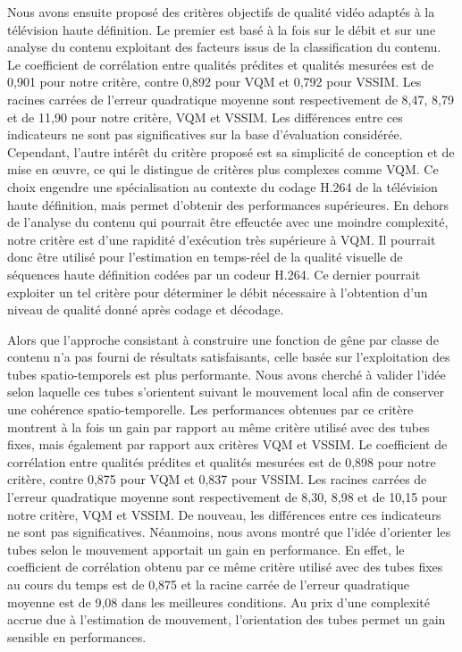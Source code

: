 Nous avons ensuite proposé des critères objectifs de qualité vidéo adaptés à la télévision haute définition. Le premier est basé à la fois sur le débit et sur une analyse du contenu exploitant des facteurs issus de la classification du contenu. Le coefficient de corrélation entre qualités prédites et qualités mesurées est de 0,901 pour notre critère, contre 0,892 pour VQM et 0,792 pour VSSIM. Les racines carrées de l'erreur quadratique moyenne sont respectivement de 8,47, 8,79 et de 11,90 pour notre critère, VQM et VSSIM. Les différences entre ces indicateurs ne sont pas significatives sur la base d'évaluation considérée. Cependant, l'autre intérêt du critère proposé est sa simplicité de conception et de mise en \oe uvre, ce qui le distingue de critères plus complexes comme VQM. Ce choix engendre une spécialisation au contexte du codage H.264 de la télévision haute définition, mais permet d'obtenir des performances supérieures. En dehors de l'analyse du contenu qui pourrait être effeuctée avec une moindre complexité, notre critère est d'une rapidité d'exécution très supérieure à VQM. Il pourrait donc être utilisé pour l'estimation en temps-réel de la qualité visuelle de séquences haute définition codées par un codeur H.264. Ce dernier pourrait exploiter un tel critère pour déterminer le débit nécessaire à l'obtention d'un niveau de qualité donné après codage et décodage.

\bigskip

Alors que l'approche consistant à construire une fonction de gêne par classe de contenu n'a pas fourni de résultats satisfaisants, celle basée sur l'exploitation des tubes spatio-temporels est plus performante. Nous avons cherché à valider l'idée selon laquelle ces tubes s'orientent suivant le mouvement local afin de conserver une cohérence spatio-temporelle. Les performances obtenues par ce critère montrent à la fois un gain par rapport au même critère utilisé avec des tubes fixes, mais également par rapport aux critères VQM et VSSIM. Le coefficient de corrélation entre qualités prédites et qualités mesurées est de 0,898 pour notre critère, contre 0,875 pour VQM et 0,837 pour VSSIM. Les racines carrées de l'erreur quadratique moyenne sont respectivement de 8,30, 8,98 et de 10,15 pour notre critère, VQM et VSSIM. De nouveau, les différences entre ces indicateurs ne sont pas significatives. Néanmoins, nous avons montré que l'idée d'orienter les tubes selon le mouvement apportait un gain en performance. En effet, le coefficient de corrélation obtenu par ce même critère utilisé avec des tubes fixes au cours du temps est de 0,875 et la racine carrée de l'erreur quadratique moyenne est de 9,08 dans les meilleures conditions. Au prix d'une complexité accrue due à l'estimation de mouvement, l'orientation des tubes permet un gain sensible en performances.


